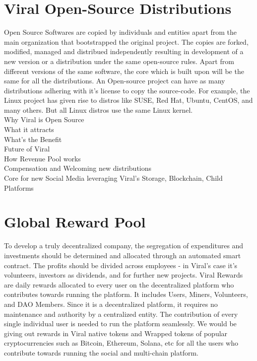 \documentclass[conference]{IEEEtran}
\begin{document}
\section{\textbf{Viral Open-Source Distributions}}
Open Source Softwares are copied by individuals and entities apart from the main organization that bootstrapped the original project. The copies are forked, modified, managed and distribued independently resulting in development of a new version or a distribution under the same open-source rules. Apart from different versions of the same software, the core which is built upon will be the same for all the distributions. An Open-source project can have as many distributions adhering with it's license to copy the source-code. For example, the Linux project has given rise to distros like SUSE, Red Hat, Ubuntu, CentOS, and many others. But all Linux distros use the same Linux kernel.\\
Why Viral is Open Source\\
What it attracts\\
What's the Benefit\\
Future of Viral\\
How Revenue Pool works\\
Compensation and Welcoming new distributions\\
Core for new Social Media leveraging Viral's Storage, Blockchain, Child Platforms\\
\section{\textbf{Global Reward Pool}}
To develop a truly decentralized company, the segregation of expenditures and investments should be determined and allocated through an automated smart contract. The profits should be divided across employees - in Viral's case it's volunteers,  investors as dividends, and for further new projects. Viral Rewards are daily rewards allocated to every user on the decentralized platform who contributes towards running the platform. It includes Users, Miners, Volunteers, and DAO Members. Since it is a decentralized platform, it requires no maintenance and authority by a centralized entity. The contribution of every single individual user is needed to run the platform seamlessly. We would be giving out rewards in Viral native tokens and Wrapped tokens of popular cryptocurrencies such as Bitcoin, Ethereum, Solana, etc for all the users who contribute towards running the social and multi-chain platform.\\
\end{document}
